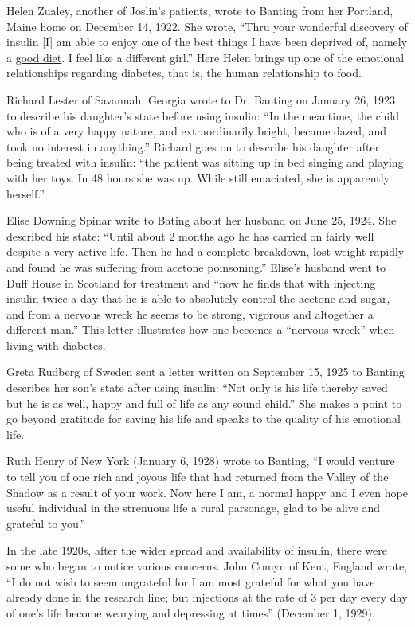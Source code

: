 \documentclass[12pt]{article}
\begin{document}
Helen Zualey, another of Joslin's patients, wrote to Banting from her Portland, Maine home on December 14, 1922. She wrote, ``Thru your wonderful discovery of insulin [I] am able to enjoy one of the best things I have been deprived of, namely a \underline{good diet}. I feel like a different girl.'' 
Here Helen brings up one of the emotional relationships regarding diabetes, that is, the human relationship to food. 

Richard Lester of Savannah, Georgia wrote to Dr. Banting on January 26, 1923 to describe his daughter's state before using insulin:
``In the meantime, the child who is of a very happy nature, and extraordinarily bright, became dazed, and took no interest in anything.''
Richard goes on to describe his daughter after being treated with insulin: ``the patient was sitting up in bed singing and playing with her toys. In 48 hours she was up. While still emaciated, she is apparently herself.'' 

Elise Downing Spinar write to Bating about her husband on June 25, 1924. She described his state:
``Until about 2 months ago he has carried on fairly well despite a very active life. Then he had a complete breakdown, lost weight rapidly and found he was suffering from acetone poinsoning.'' Elise's husband went to Duff House in Scotland for treatment and ``now he finds that with injecting insulin twice a day that he is able to absolutely control the acetone and sugar, and from a nervous wreck he seems to be strong, vigorous and altogether a different man.''
This letter illustrates how one becomes a ``nervous wreck'' when living with diabetes. 

Greta Rudberg of Sweden sent a letter written on September 15, 1925 to Banting describes her son's state after using insulin:
``Not only is his life thereby saved but he is as well, happy and full of life as any sound child.''
She makes a point to go beyond gratitude for saving his life and speaks to the quality of his emotional life. 

Ruth Henry of New York (January 6, 1928) wrote to Banting, ``I would venture to tell you of one rich and joyous life that had returned from the Valley of the Shadow as a result of your work. Now here I am, a normal happy and I even hope useful individual in the strenuous life a rural parsonage, glad to be alive and grateful to you.'' 

In the late 1920s, after the wider spread and availability of insulin, there were some who began to notice various concerns. John Comyn of Kent, England wrote, ``I do not wish to seem ungrateful for I am most grateful for what you have already done in the research line; but injections at the rate of 3 per day every day of one's life become wearying and depressing at times'' (December 1, 1929). 
\end{document}

